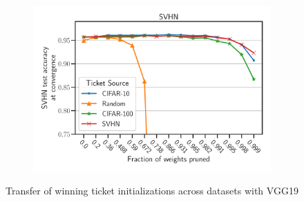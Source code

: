 \begin{figure}[h]
            \begin{subfigure}[b]{0.45\textwidth}
                \includegraphics[width=\linewidth]{../openreview/plots/Exp2_VGG_SVHN_N.pdf}
            \end{subfigure}
        \caption{Transfer of winning ticket initializations across datasets with VGG19}
        \label{fig:exp2_vgg}
    \end{figure}


    
       
